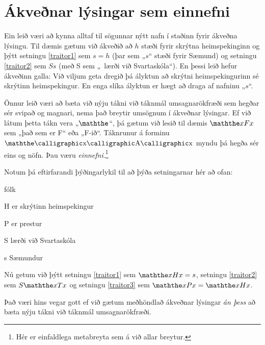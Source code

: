 \section{Ákveðnar lýsingar sem einnefni} %

Ein leið væri að kynna alltaf til sögunnar nýtt nafn í staðinn fyrir ákveðna lýsingu. Til dæmis gætum við ákveðið að $h$ stæði fyrir skrýtna heimspekinginn og þýtt setningu \ref{traitor1} sem $s = h$ (þar sem „$s$“ stæði fyrir Sæmund) og setningu \ref{traitor2} sem $Ss$ (með S sem „\blank\ lærði við Svartaskóla“). En þessi leið hefur ákveðinn galla: Við viljum geta dregið þá ályktun að skrýtni heimspekingurinn sé skrýtinn heimspekingur. En enga slíka ályktun er hægt að draga af nafninu „$s$“. 

Önnur leið væri að bæta við nýju tákni við táknmál umsagnarökfræði sem hegðar sér svipað og magnari, nema það breytir umsögnum í ákveðnar lýsingar. Ef við látum þetta tákn vera „$\maththe$“, þá gætum við lesið til dæmis $\maththe x Fx$ sem „það sem er F“ eða „F-ið“. Táknrunur á forminu $\maththe \meta{x} \meta{A}\meta{x}$ myndu þá hegða sér eins og nöfn. Þau væru \emph{einnefni}.\footnote{Hér er  einfaldlega metabreyta sem á við allar breytur. }

Notum þá eftirfarandi þýðingarlykil til að þýða setningarnar hér að ofan:
	\begin{ekey}
		\item[\text{yfirgrip}] fólk
		\item[H]  er skrýtinn heimspekingur
		\item[P]  er prestur
		\item[S]  lærði við Svartaskóla
		\item[s] Sæmundur
	\end{ekey}
Nú getum við þýtt setningu \ref{traitor1} sem $\maththe x Hx = s$, setningu \ref{traitor2} sem $S\maththe xTx$ og setningu \ref{traitor3} sem $\maththe x Px = \maththe x Hx$.

Það væri hins vegar gott ef við gætum meðhöndlað ákveðnar lýsingar \emph{án þess} að bæta nýju tákni við táknmál umsagnarökfræði. 

